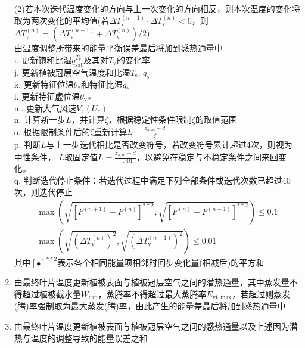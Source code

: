 \begin{enumerate}
    (2)若本次迭代温度变化的方向与上一次变化的方向相反，则本次温度的变化将取为两次变化的平均值(若$\Delta T_{\mathrm {v}} ^{\left(n-1\right)} \cdot \Delta T_{\mathrm {v}} ^{\left(n\right)}<0$，则$\Delta T_{\mathrm {v}} ^{\left(n\right)}=\left(\Delta T_{\mathrm {v}} ^{\left(n-1\right)}+\Delta T_{\mathrm {v}} ^{\left(n\right)}\right)/2$)\\
    由温度调整所带来的能量平衡误差最后将加到感热通量中\\
    i. 更新饱和比湿$q_{\mathrm{sat}}^{T_{\mathrm {v}} }$及其对$T_{\mathrm {v}} $的变化率 \\
    j. 更新植被冠层空气温度和比湿$T_{\mathrm {s}} $, $q_{\mathrm {s}} $ \\
    k. 更新特征位温$\theta_\ast$和特征比湿$q_\ast$ \\
    l. 更新特征虚位温$\theta_{\mathrm{v\ast}}$ \\
    m. 更新大气风速$V_{\mathrm {a}} \left(U_{\mathrm {c}} \right)$ \\
    n. 计算新一步$L$，并计算$\zeta$，根据稳定性条件限制$\zeta$的取值范围 \\
    o. 根据限制条件后的$\zeta$重新计算$L=\frac{z_{\mathrm{a,m}}-d}{\zeta}$ \\
    p. 判断$L$与上一步迭代相比是否改变符号，若改变符号累计超过4次，则视为中性条件，
    $L$取固定值$L=\frac{z_{\mathrm{a,m}}-d}{-0.01}$，以避免在稳定与不稳定条件之间来回变化。\\
    q. 判断迭代停止条件：若迭代过程中满足下列全部条件或迭代次数已超过40次，则迭代停止
    \begin{equation}
      \begin{array}{l}\max\left( \sqrt{\left[F^{(n+1)}-F^{(n)}\right]^{\ast\ast2}}, \sqrt{\left[F^{(n)}-F^{(n-1)}\right]^{\ast\ast2}} \right) \leqslant 0.1 \\[3.0 ex]
      \max\left( \sqrt{\left(\Delta T_{\mathrm{v}}^{(n)}\right)^{2}}, \sqrt{\left(\Delta T_{\mathrm{v}}^{(n-1)}\right)^{2}} \right) \leqslant 0.01\end{array}
    \end{equation}
    其中$\left[\bullet\right]^{\ast\ast2}$表示各个相同能量项相邻时间步变化量(相减后)的平方和
  \item 由最终叶片温度更新植被表面与植被冠层空气之间的潜热通量，其中蒸发量不得超过植被截水量$W_{\mathrm{can}}$，蒸腾率不得超过最大蒸腾率$ E_{\mathrm{vt,max}}$，若超过则蒸发(腾)率强制取为最大蒸发(腾)率，由此产生的能量差最后将加到感热通量中
  \item 由最终叶片温度更新植被表面与植被冠层空气之间的感热通量以及上述因为潜热与温度的调整导致的能量误差之和

\end{enumerate}
